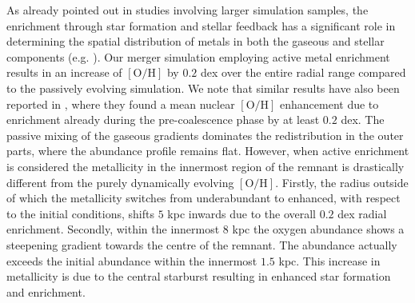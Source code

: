\documentclass[a4paper,fleqn,usenatbib]{mnras}
\begin{document}
As already pointed out in studies involving larger simulation samples, the enrichment through star formation and 
stellar feedback has a significant role in determining the spatial distribution of metals in both the gaseous and 
stellar components (e.g. \citealt{2010A&A...518A..56M, 2011MNRAS.417..580P, 2012ApJ...746..108T}).
Our merger simulation employing active metal enrichment results in an increase of $[\mathrm{O}/\mathrm{H}]$ by $0.2$ dex
over the entire radial range compared to the passively evolving simulation. We note that similar results have also been reported in \citet{2012ApJ...746..108T},
where they found a mean nuclear $[\mathrm{O}/\mathrm{H}]$ enhancement due to enrichment already during 
the pre-coalescence phase by at least $0.2$ dex.
The passive mixing of the gaseous gradients dominates the redistribution in the outer parts, where
the abundance profile remains flat.
However, when active enrichment is considered the metallicity
in the innermost region of the remnant is drastically different from the purely
dynamically evolving $[\mathrm{O}/\mathrm{H}]$. Firstly, the radius outside of which the 
metallicity switches from underabundant to enhanced, with respect to the initial conditions, shifts $5$ kpc
inwards due to the overall $0.2$ dex radial enrichment. Secondly,
within the innermost $8$ kpc the oxygen abundance shows a steepening
gradient towards the centre of the remnant. The abundance actually
exceeds the initial abundance within the innermost $1.5$ kpc.
This increase in metallicity is due to the central
starburst resulting in enhanced star formation and enrichment. 
\end{document}
